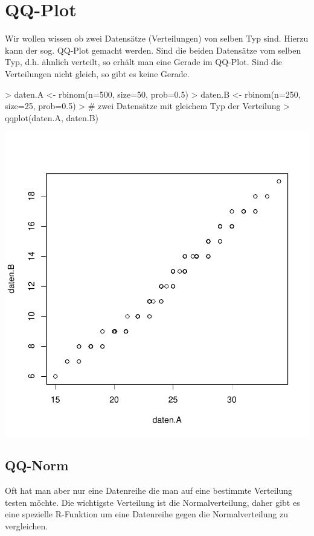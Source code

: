 \section{QQ-Plot}
Wir wollen wissen ob zwei Datensätze (Verteilungen) von selben Typ sind.
Hierzu kann der sog. QQ-Plot gemacht werden. Sind die beiden Datensätze
vom selben Typ, d.h. ähnlich verteilt, so erhält man eine Gerade im 
QQ-Plot. Sind die Verteilungen nicht gleich, so gibt es keine Gerade. 

\begin{Schunk}
\begin{Sinput}
> daten.A <- rbinom(n=500, size=50, prob=0.5)
> daten.B <- rbinom(n=250, size=25, prob=0.5)
> # zwei Datensätze mit gleichem Typ der Verteilung
> qqplot(daten.A, daten.B)
\end{Sinput}
\end{Schunk}
\includegraphics{definitionen-028}

\subsection{QQ-Norm}
Oft hat man aber nur eine Datenreihe die man auf eine bestimmte 
Verteilung testen möchte. Die wichtigste Verteilung ist die
Normalverteilung, daher gibt es eine spezielle R-Funktion um
eine Datenreihe gegen die Normalverteilung zu vergleichen.

